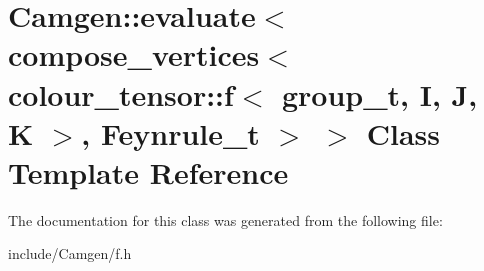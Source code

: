 \hypertarget{a00168}{\section{Camgen\-:\-:evaluate$<$ compose\-\_\-vertices$<$ colour\-\_\-tensor\-:\-:f$<$ group\-\_\-t, I, J, K $>$, Feynrule\-\_\-t $>$ $>$ Class Template Reference}
\label{a00168}
}


The documentation for this class was generated from the following file\-:\begin{DoxyCompactItemize}
\item 
include/\-Camgen/f.\-h\end{DoxyCompactItemize}
